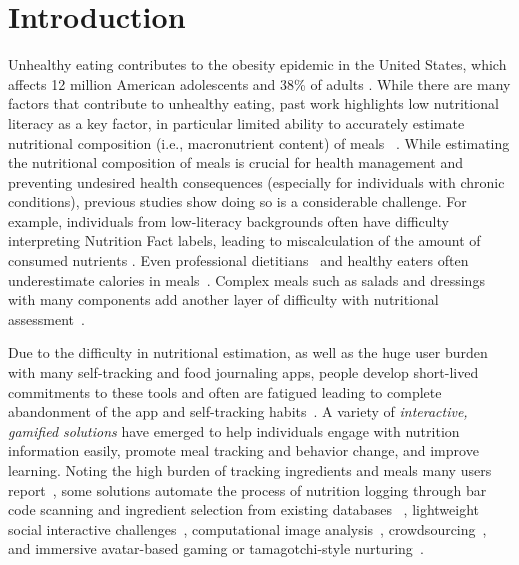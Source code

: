 \section{Introduction}
Unhealthy eating contributes to the obesity epidemic in the United States, which affects 12 million American adolescents and 38\% of adults \cite{trustforamericashealth,cdc2015,cdc2020}. 
While there are many factors that contribute to unhealthy eating, past work highlights low nutritional literacy as a key factor, in particular limited ability to accurately estimate nutritional composition (i.e., macronutrient content) of meals ~\cite{kindig2004health}. 
While estimating the nutritional composition of meals is crucial for health management and preventing undesired health consequences (especially for individuals with chronic conditions), previous studies show doing so is a considerable challenge. For example, individuals from low-literacy backgrounds often have difficulty interpreting Nutrition Fact labels, leading to miscalculation of the amount of consumed nutrients \cite{chaudry2013formative,huizinga2009literacy,rothman2006patient}. Even professional dietitians~\cite{chandon2007obesity} and healthy eaters often underestimate calories in meals~\cite{chandon2007biasing}. Complex meals such as salads and dressings with many components add another layer of difficulty with nutritional assessment~\cite{noronha2011platemate}.


Due to the difficulty in nutritional estimation, as well as the huge user burden with many self-tracking and food journaling apps, people develop short-lived commitments to these tools and often are fatigued leading to complete abandonment of the app and self-tracking habits~\cite{choe2014understanding,Cordeiro:2015:RMF:2702123.2702154,cordeiro2015barriers,epstein2016crumbs,mattila2008mobile}. A variety of \textit{interactive, gamified solutions} have emerged to help individuals engage with nutrition information easily, promote meal tracking and behavior change, and improve learning. Noting the high burden of tracking ingredients and meals many users report~\cite{desai2019personal}, some solutions automate the process of nutrition logging 
through bar code scanning and ingredient selection from existing databases ~\cite{beijbom2015menu,bomfim2018pirate,bomfim2020food,siek2009evaluation}, lightweight social interactive challenges~\cite{Cordeiro:2015:RMF:2702123.2702154,epstein2016crumbs},
computational image analysis~\cite{anthimopoulos2015computer,kong2012dietcam,rhyner2016carbohydrate,zhang2015snap,zhu2010use}, crowdsourcing~\cite{mamykina2011examining,noronha2011platemate}, and immersive avatar-based gaming or tamagotchi-style  nurturing~\cite{ahn2017immersive,byrne2012caring,hwang2017monster,lin2006fish}.


